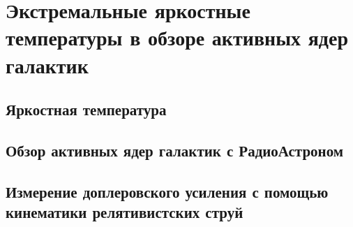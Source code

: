 \chapter{Экстремальные яркостные температуры в обзоре активных ядер галактик} \label{chapt3}

\section{Яркостная температура}

\section{Обзор активных ядер галактик с РадиоАстроном}

\section{Измерение доплеровского усиления с помощью кинематики релятивистских струй}

